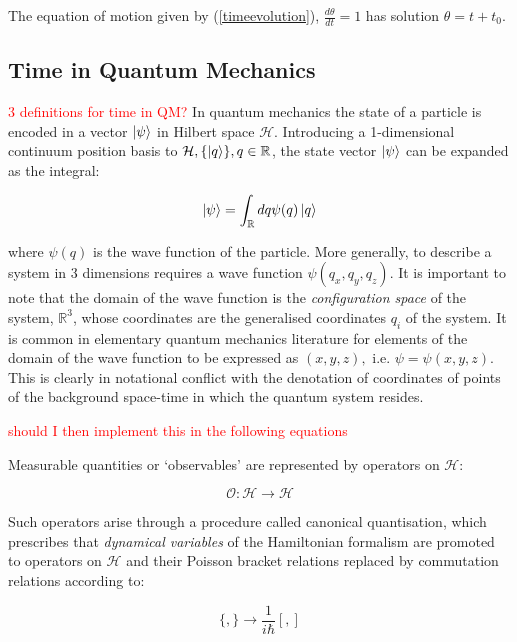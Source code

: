 \documentclass{article}
\begin{document}
\noindent The equation of motion given by (\ref{timeevolution}), $\frac{d\theta}{dt}=1$ has solution $\theta=t+t_0$.

\subsection{Time in Quantum Mechanics}
\textcolor{red}{3 definitions for time in QM?}
In quantum mechanics the state of a particle is encoded in a vector $\ket{\psi}$ in Hilbert space $\mathcal{H}$. Introducing a 1-dimensional continuum position basis to $\mathcal{H}, \{\ket{q}\}, q \in \mathbb{R}$, the state vector $\ket{\psi}$ can be expanded as the integral:

\begin{equation}
	\ket{\psi} = \int_{\mathbb{R}}dq\psi(q)\ket{q}
\end{equation}

\noindent where $\psi(q)$ is the wave function of the particle. More generally, to describe a system in 3 dimensions requires a wave function $\psi(q_x,q_y,q_z)$. It is important to note that the domain of the wave function is the \textit{configuration space} of the system, $\mathbb{R}^3$, whose coordinates are the generalised coordinates $q_i$ of the system. It is common in elementary quantum mechanics literature for elements of the domain of the wave function to be expressed as $(x,y,z), \text{ i.e. } \psi = \psi(x,y,z)$. This is clearly in notational conflict with the denotation of coordinates of points of the background space-time in which the quantum system resides. 

\textcolor{red}{should I then implement this in the following equations}

Measurable quantities or `observables' are represented by operators on $\mathcal{H}$:

\begin{equation}
	\mathcal{O}: \mathcal{H} \rightarrow \mathcal{H}
\end{equation}

Such operators arise through a procedure called canonical quantisation, which prescribes that \textit{dynamical variables} of the Hamiltonian formalism are promoted to operators on $\mathcal{H}$ and their Poisson bracket relations replaced by commutation relations according to:

\begin{equation}
\{,\} \rightarrow \frac{1}{i\hbar}[,]
\end{equation}
\end{document}
